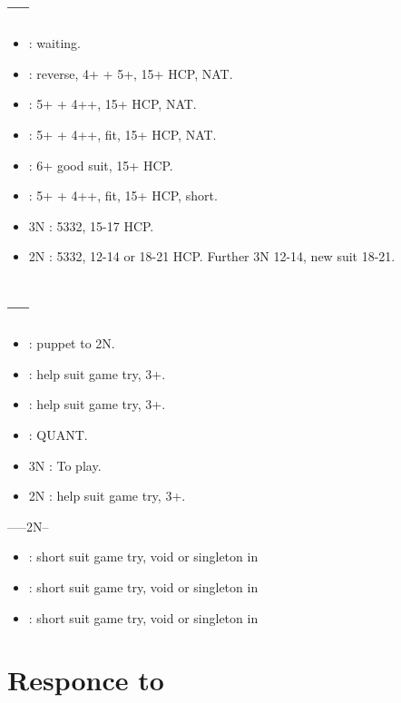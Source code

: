 \documentclass[12pt,twoside,a5paper]{report}%
\begin{document}
	\section*{----}
		\begin{itemize}
		\renewcommand{\labelitemi}{}
		\item {} : waiting.
		\item {} : reverse, 4+\sp{} + 5+\he{}, 15+ HCP, NAT.
		\item {} : 5+\he{} + 4+\cl{}+, 15+ HCP, NAT.
		\item {} : 5+\he{} + 4+\di{}+, fit, 15+ HCP, NAT.
		\item {} : 6+\he{} good suit, 15+ HCP.
		\item {} : 5+\he{} + 4+\di{}+, fit, 15+ HCP, short\sp{}.
		\item 3N : 5332, 15-17 HCP.
		\item 2N : 5332, 12-14 or 18-21 HCP. Further 3N 12-14, new suit 18-21.
		\end{itemize}

	\section*{----}
		\begin{itemize}
		\renewcommand{\labelitemi}{} 
		\item {} : puppet to 2N.
		\item {} : help suit game try, 3+\cl{}.
		\item {} : help suit game try, 3+\di{}.
		\item {} : QUANT.
		\item 3N : To play.
		\item 2N : help suit game try, 3+\sp{}. 
		\end{itemize}

		------2N--
		\begin{itemize}
		\renewcommand{\labelitemi}{}
		\item {} : short suit game try, void or singleton in \cl{}
		\item {} : short suit game try, void or singleton in \di{}
		\item {} : short suit game try, void or singleton in \sp{}
		\end{itemize}

\chapter*{Responce to }
	
\end{document}
